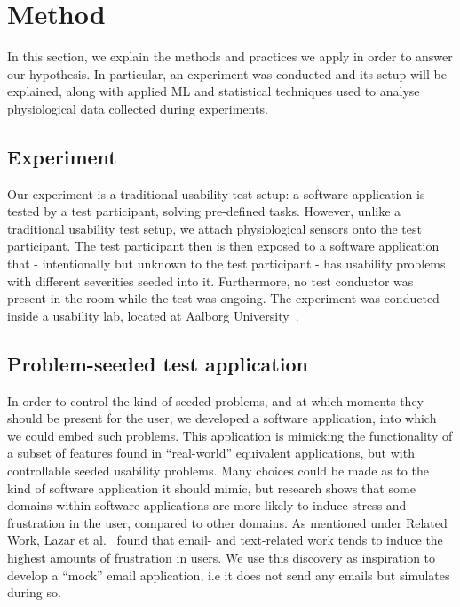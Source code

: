 \section{Method}\label{sec:method}
In this section, we explain the methods and practices we apply in order to answer our hypothesis. In particular, an
experiment was conducted and its setup will be explained, along with applied ML and statistical techniques used to
analyse physiological data collected during experiments.

\subsection{Experiment}
Our experiment is a traditional usability test setup: a software application is tested by a test participant, solving pre-defined tasks. 
However, unlike a traditional usability test setup, we attach physiological sensors onto the test participant.
The test participant then is then exposed to a software application that - intentionally but unknown to the test participant - has usability problems with different severities seeded into it. 
Furthermore, no test conductor was present in the room while the test was ongoing.
The experiment was conducted inside a usability lab, located at Aalborg University~\cite{usability_lab_cassiopeia}.


\subsection{Problem-seeded test application}
In order to control the kind of seeded problems, and at which moments they should be present for the user, we developed a software
application, into which we could embed such problems. This application is mimicking the functionality of a subset of
features found in ``real-world'' equivalent applications, but with controllable seeded usability problems.  Many choices could be
made as to the kind of software application it should mimic, but research shows that some domains within software
applications are more likely to induce stress and frustration in the user, compared to other domains.  As mentioned
under Related Work, Lazar et al.~\cite{frustration_with_computers} found that email- and text-related work tends to
induce the highest amounts of frustration in users. We use this discovery as inspiration to develop a ``mock'' email
application, i.e it does not send any emails but simulates during so.

